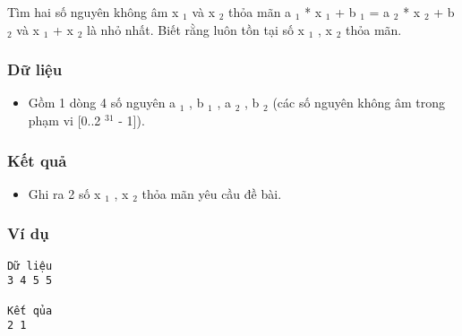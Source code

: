 

Tìm hai số nguyên không âm x $_ 1 $ và x $_ 2 $ thỏa mãn a $_ 1 $ * x $_ 1 $ + b $_ 1 $ = a $_ 2 $ * x $_ 2 $ + b $_ 2 $ và x $_ 1 $ + x $_ 2 $ là nhỏ nhất. Biết rằng luôn tồn tại số x $_ 1 $ , x $_ 2 $ thỏa mãn.

\subsubsection{Dữ liệu}
\begin{itemize}
	\item Gồm 1 dòng 4 số nguyên a $_ 1 $ , b $_ 1 $ , a $_ 2 $ , b $_ 2 $ (các số nguyên không âm trong phạm vi [0..2 $^ 31 $ - 1]).
\end{itemize}

\subsubsection{Kết quả}
\begin{itemize}
	\item Ghi ra 2 số x $_ 1 $ , x $_ 2 $ thỏa mãn yêu cầu đề bài.
\end{itemize}

\subsubsection{Ví dụ}
\begin{verbatim}
Dữ liệu
3 4 5 5

Kết qủa
2 1
\end{verbatim}